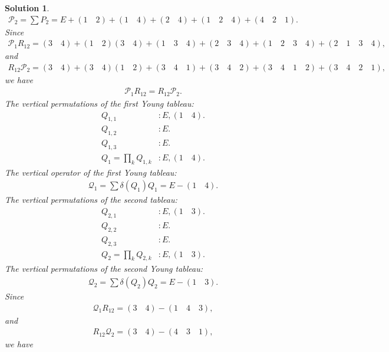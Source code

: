 \documentclass[UTF8,10pt,a4paper]{article}
\theoremstyle{Problem}
\theoremstyle{Solution}
\newtheorem*{sol}{Solution}
\begin{document}
\begin{sol}
    \begin{align}
        \mathcal{P}_2=\sum P_2=E+(1\quad 2)+(1\quad 4)+(2\quad 4)+(1\quad 2\quad 4)+(4\quad 2\quad 1).
    \end{align}
    Since
    \begin{align}
        \mathcal{P}_1R_{12}=(3\quad 4)+(1\quad 2)(3\quad 4)+(1\quad 3\quad 4)+(2\quad 3\quad 4)+(1\quad 2\quad 3\quad 4)+(2\quad 1\quad 3\quad 4),
    \end{align}
    and
    \begin{align}
        R_{12}\mathcal{P}_2=(3\quad 4)+(3\quad 4)(1\quad 2)+(3\quad 4\quad 1)+(3\quad 4\quad 2)+(3\quad 4\quad 1\quad 2)+(3\quad 4\quad 2\quad 1),
    \end{align}
    we have
    \begin{align}
        \mathcal{P}_1R_{12}=R_{12}\mathcal{P}_2.
    \end{align}
    The vertical permutations of the first Young tableau:
    \begin{align}
        Q_{1,1}&:E,(1\quad 4).\\
        Q_{1,2}&:E.\\
        Q_{1,3}&:E.\\
        Q_1=\prod_kQ_{1,k}&:E,(1\quad 4).
    \end{align}
    The vertical operator of the first Young tableau:
    \begin{align}
        \mathcal{Q}_1=\sum\delta(Q_1)Q_1=E-(1\quad 4).
    \end{align}
    The vertical permutations of the second tableau:
    \begin{align}
        Q_{2,1}&:E,(1\quad 3).\\
        Q_{2,2}&:E.\\
        Q_{2,3}&:E.\\
        Q_2=\prod_kQ_{2,k}&:E,(1\quad 3).
    \end{align}
    The vertical permutations of the second Young tableau:
    \begin{align}
        \mathcal{Q}_2=\sum\delta(Q_2)Q_2=E-(1\quad 3).
    \end{align}
    Since
    \begin{align}
        \mathcal{Q}_1R_{12}=(3\quad 4)-(1\quad 4\quad 3),
    \end{align}
    and
    \begin{align}
        R_{12}\mathcal{Q}_2=(3\quad 4)-(4\quad 3\quad 1),
    \end{align}
    we have
    \begin{align}

\end{align}
\end{sol}
\end{document}
